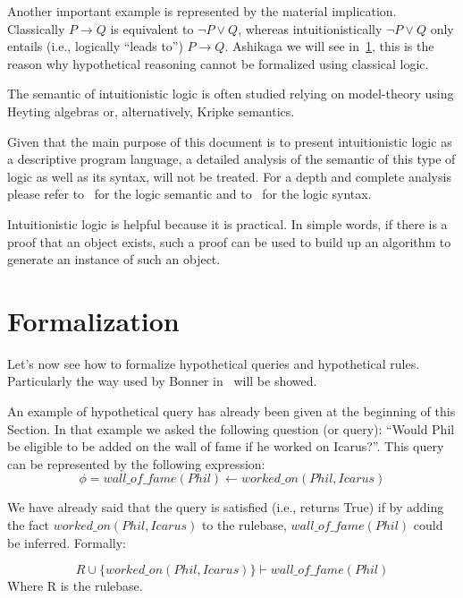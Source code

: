 Another important example is represented by the material implication.
Classically $P \to Q$ is equivalent to $\lnot P \lor Q$, whereas intuitionistically
$\lnot P \lor Q$ only entails (i.e., logically ``leads to'') $P \to Q$.
Ashikaga we will see in~\ref{sec:formalization}, this is the reason why hypothetical reasoning
cannot be formalized using classical logic.

The semantic of intuitionistic logic is often studied relying on model-theory
using Heyting algebras or, alternatively, Kripke semantics.

Given that the main purpose of this document is to present
intuitionistic logic as a descriptive program language, a detailed analysis of the semantic
of this type of logic  as well as its syntax, will not be treated. For a depth and complete analysis please refer
to~\cite{Kripke1963-KRISAO-2} for the logic semantic and to~\cite{Dirk} for the logic syntax.

Intuitionistic logic is helpful because it is practical. In simple words, if there is
a proof that an object exists, such a proof can be used to build up an algorithm to
generate an instance of such an object.


\section{Formalization}
\label{sec:formalization}
Let's now see how to formalize hypothetical queries and hypothetical rules.
Particularly the way used by Bonner in~\cite{Bonner88alogic} will be showed.

An example of hypothetical query has already been given at the beginning of this Section.
In that example we asked the following question (or query): ``Would Phil be eligible to
be added on the wall of fame if he worked on Icarus?''. This query
can be represented by the following expression:
\begin{equation}
  \phi = wall\_of\_fame(Phil) \leftarrow worked\_on(Phil, Icarus)
\end{equation}

We have already said that the query is satisfied (i.e., returns True) if by
adding the fact $worked\_on(Phil, Icarus)$ to the rulebase,  $wall\_of\_fame(Phil)$ could
be inferred. Formally:

\begin{equation}
  R \cup \{worked\_on(Phil, Icarus)\} \vdash wall\_of\_fame(Phil)
\end{equation}
Where R is the rulebase.


